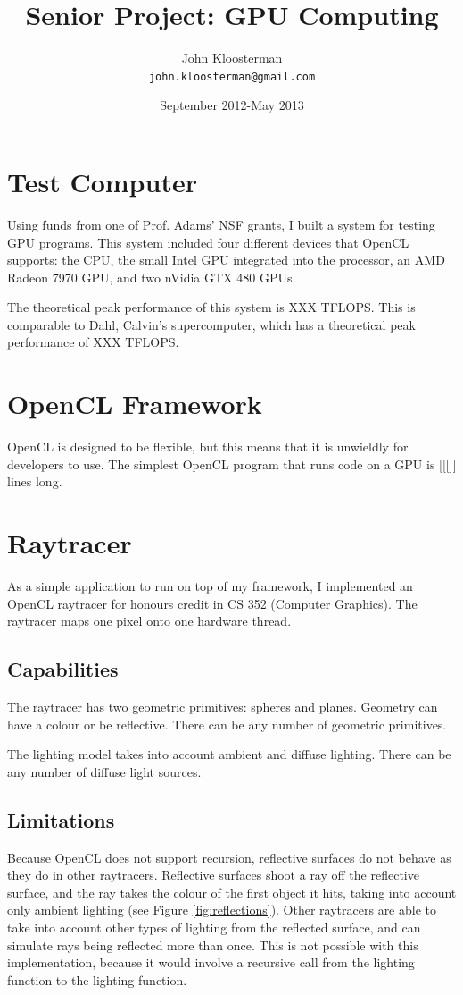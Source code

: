 \documentclass{article}
\begin{document}
\title{Senior Project: GPU Computing}
\author{John Kloosterman \\
  \texttt{john.kloosterman@gmail.com}}
\date{September 2012-May 2013}
\maketitle



\section{Test Computer}
Using funds from one of Prof. Adams' NSF grants, I built a system for testing GPU programs. This system included four different devices that OpenCL supports: the CPU, the small Intel GPU integrated into the processor, an AMD Radeon 7970 GPU, and two nVidia GTX 480 GPUs.

The theoretical peak performance of this system is XXX TFLOPS. This is comparable to Dahl, Calvin's supercomputer, which has a theoretical peak performance of XXX TFLOPS. 

\section{OpenCL Framework}
OpenCL is designed to be flexible, but this means that it is unwieldly for developers to use. The simplest OpenCL program that runs code on a GPU is [[[]] lines long.


\section{Raytracer}
As a simple application to run on top of my framework, I implemented an OpenCL raytracer for honours credit in CS 352 (Computer Graphics). The raytracer maps one pixel onto one hardware thread.

\subsection{Capabilities}
The raytracer has two geometric primitives: spheres and planes. Geometry can have a colour or be reflective. There can be any number of geometric primitives.

The lighting model takes into account ambient and diffuse lighting. There can be any number of diffuse light sources.

\subsection{Limitations}
Because OpenCL does not support recursion, reflective surfaces do not behave as they do in other raytracers. Reflective surfaces shoot a ray off the reflective surface, and the ray takes the colour of the first object it hits, taking into account only ambient lighting (see Figure \ref{fig:reflections}). Other raytracers are able to take into account other types of lighting from the reflected surface, and can simulate rays being reflected more than once. This is not possible with this implementation, because it would involve a recursive call from the lighting function to the lighting function.
\end{document}
